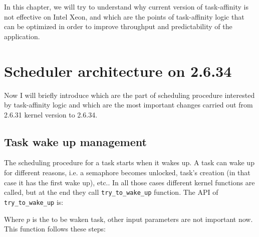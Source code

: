 In this chapter, we will try to understand why current version of task-affinity is not effective on Intel Xeon, and which are the points of task-affinity 
logic that can be optimized in order to improve throughput and predictability of the application.

\section{Scheduler architecture on 2.6.34}

Now I will briefly introduce which are the part of scheduling procedure 
interested by task-affinity logic and which are the most important changes 
carried out from 2.6.31 kernel version to 2.6.34.

\subsection{Task wake up management}

The scheduling procedure for a task starts when it wakes up. A task can wake up
for different reasons, i.e. a semaphore becomes unlocked, task's creation
(in that case it has the first wake up), etc.. In all those cases different
kernel functions are called, but at the end they call 
\texttt{try\_to\_wake\_up} function. The API of \texttt{try\_to\_wake\_up} is:

\lstset{basicstyle=\footnotesize, language=c, captionpos=b, frame=single, label=lis:APIttwu}


Where $p$ is the to be waken task, other input parameters are not important now.
This function follows these steps:

